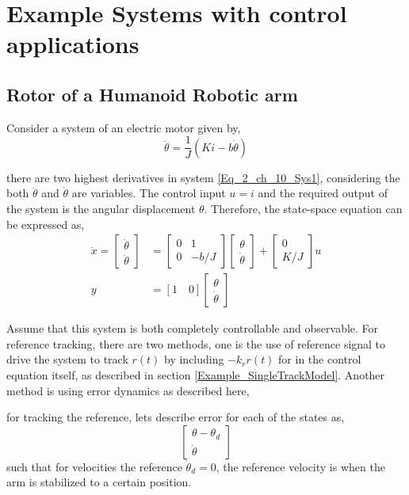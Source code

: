 \chapter{Example Systems with control applications}

\section{Rotor of a Humanoid Robotic arm}

Consider a system of an electric motor given by,
\begin{equation} \label{Eq_2_ch_10_Sys1}
	\ddot{\theta} = \frac{1}{J}(K i - b \dot{\theta})
\end{equation}

there are two highest derivatives in system \eqref{Eq_2_ch_10_Sys1}, considering the both $\ddot{\theta}$ and $\dot{\theta}$ are variables. The control input $u = i$ and the required output of the system is the angular displacement $\theta$. Therefore, the state-space equation can be expressed as,
\begin{align}
	\dot{x} = \begin{bmatrix}
	\dot{\theta} \\ \ddot{\theta}
	\end{bmatrix} &= \begin{bmatrix}
		0 & 1 \\ 0 & -b/J
	\end{bmatrix}\begin{bmatrix}
		\theta \\ \dot{\theta}
	\end{bmatrix} + \begin{bmatrix}
	0 \\ K/J
	\end{bmatrix}u \\
	y &= [1 \quad 0] \begin{bmatrix}
	\theta \\ \dot{\theta}
	\end{bmatrix}
\end{align}

Assume that this system is both completely controllable and observable. For reference tracking, there are two methods, one is the use of reference signal to drive the system to track $r(t)$ by including $-k_{r}r(t)$ for in the control equation itself, as described in section \ref{Example_SingleTrackModel}. Another method is using error dynamics as described here,

for tracking the reference, lets describe error for each of the states as,
\begin{equation}
	\begin{bmatrix}
		\theta - \theta_{d} \\ \dot{\theta}
	\end{bmatrix}
\end{equation}
such that for velocities the reference $\dot{\theta}_{d} = 0$, the reference velocity is when the arm is stabilized to a certain position. 

